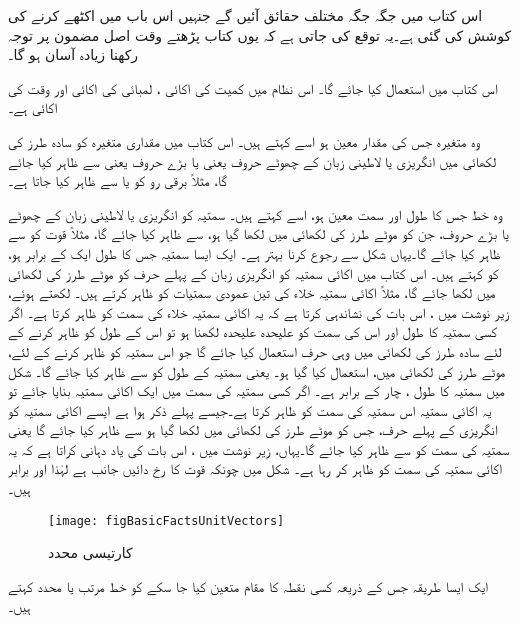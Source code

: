 اس کتاب میں جگہ جگہ مختلف حقائق آئیں گے جنہیں اس باب میں اکٹھے کرنے کی کوشش کی گئی ہے۔یہ توقع کی جاتی ہے کہ یوں کتاب پڑھتے وقت اصل مضمون پر توجہ رکھنا زیادہ آسان ہو گا۔

اس کتاب میں   استعمال کیا جائے گا۔ اس نظام میں کمیت کی اکائی ،  لمبائی کی اکائی  اور وقت کی اکائی  ہے۔

وہ متغیرہ جس کی مقدار معین ہو اسے  کہتے ہیں۔ اس کتاب میں مقداری متغیرہ کو سادہ طرز کی لکھائی میں انگریزی یا لاطینی زبان کے چھوٹے حروف  یعنی   یا بڑے حروف یعنی   سے ظاہر کیا جائے گا، مثلاً برقی رو کو  یا  سے ظاہر کیا جاتا ہے۔

	وہ خط جس کا طول اور سمت معین ہو، اسے  کہتے ہیں۔ سمتیہ کو انگریزی یا لاطینی زبان کے چھوٹے یا  بڑے حروف،  جن کو موٹے طرز کی لکھائی میں لکھا گیا ہو،  سے ظاہر کیا جائے گا، مثلاً قوت کو  سے ظاہر کیا جائے گا۔یہاں شکل   سے رجوع کرنا بہتر ہے۔ ایک ایسا سمتیہ جس کا طول ایک کے برابر ہو،  کو  کہتے ہیں۔ اس کتاب میں اکائی سمتیہ کو انگریزی زبان کے پہلے حرف کو موٹے طرز کی لکھائی میں لکھا جائے گا، مثلاً اکائی سمتیہ  خلاء کی تین عمودی سمتیات  کو ظاہر کرتے ہیں۔ لکھتے ہوئے، زیر نوشت میں ، اس بات کی نشاندہی  کرتا ہے کہ یہ اکائی سمتیہ خلاء کی  سمت کو ظاہر کرتا ہے۔ اگر کسی سمتیہ  کا طول اور اس کی سمت کو علیحدہ علیحدہ لکھنا ہو تو اس کے طول کو ظاہر کرنے کے لئے سادہ طرز کی لکھائی میں وہی حرف استعمال کیا جائے گا جو اس سمتیہ کو ظاہر کرنے کے لئے، موٹے طرز کی لکھائی میں، استعمال کیا گیا ہو۔ یعنی سمتیہ  کے طول کو  سے ظاہر کیا جائے گا۔ شکل میں سمتیہ   کا طول ، چار کے برابر ہے۔ اگر کسی سمتیہ کی سمت میں ایک اکائی سمتیہ بنایا جائے تو یہ اکائی سمتیہ اس سمتیہ کی سمت کو ظاہر کرتا ہے۔جیسے پہلے ذکر ہوا ہے  ایسے اکائی سمتیہ کو انگریزی کے پہلے حرف،  جس کو موٹے طرز کی لکھائی میں لکھا گیا ہو  سے ظاہر کیا جائے گا یعنی سمتیہ  کی سمت کو  سے ظاہر کیا جائے گا۔یہاں،  زیر نوشت میں  ، اس بات کی یاد دہانی کراتا ہے کہ یہ اکائی سمتیہ  کی سمت کو ظاہر کر رہا ہے۔ شکل میں چونکہ قوت  کا رخ دائیں جانب ہے لہٰذا   اور   برابر ہیں۔
\begin{figure}
\centering
\texttt{[image: figBasicFactsUnitVectors]}
\caption{کارتیسی محدد}
\label{شکل_حقائق_اکائی_سمتیہ}
\end{figure}
%
ایک ایسا طریقہ جس کے ذریعہ کسی نقطہ کا مقام متعین کیا جا سکے کو خط مرتب یا محدد کہتے ہیں۔

